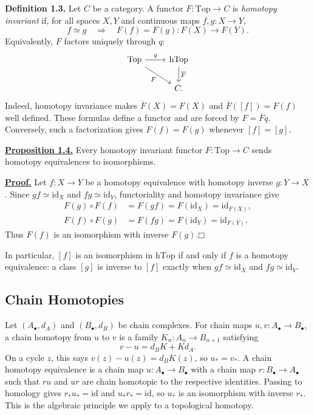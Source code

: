 \documentclass[11pt]{article}
\newcommand{\coursebold}[1]{{\color{burgundy}\textbf{#1}}}
\newcommand{\facehead}[1]{\subsection{#1}}
\begin{document}
\hypertarget{def:homotopy-invariant}{}\coursebold{Definition 1.3.} Let $C$ be a category. A functor $F:\mathrm{Top}\to C$ is \emph{homotopy invariant} if, for all spaces $X,Y$ and continuous maps $f,g:X\to Y$,
\[
f\simeq g\quad\Longrightarrow\quad F(f)=F(g):F(X)\longrightarrow F(Y).
\]
Equivalently, $F$ factors uniquely through $q$:
\[
\begin{tikzcd}
\mathrm{Top}\arrow[r,"q"]\arrow[dr,"F"']&\mathrm{hTop}\arrow[d,"\overline F"]\\
&C.
\end{tikzcd}
\]
Indeed, homotopy invariance makes $\overline F(X)=F(X)$ and $\overline F([f])=F(f)$ well defined. These formulas define a functor and are forced by $F=\overline Fq$. Conversely, such a factorization gives $F(f)=F(g)$ whenever $[f]=[g]$.

\hypertarget{prop:homotopy-invariant}{}\coursebold{\hyperlink{proof:homotopy-invariant}{Proposition 1.4.}} Every homotopy invariant functor $F:\mathrm{Top}\to C$ sends homotopy equivalences to isomorphisms.

\hypertarget{proof:homotopy-invariant}{}\coursebold{\hyperlink{prop:homotopy-invariant}{Proof.}} Let $f:X\to Y$ be a homotopy equivalence with homotopy inverse $g:Y\to X$. Since $gf\simeq\mathrm{id}_X$ and $fg\simeq\mathrm{id}_Y$, functoriality and homotopy invariance give
\[
\begin{aligned}
F(g)\circ F(f)&=F(gf)=F(\mathrm{id}_X)=\mathrm{id}_{F(X)},\\
F(f)\circ F(g)&=F(fg)=F(\mathrm{id}_Y)=\mathrm{id}_{F(Y)}.
\end{aligned}
\]
Thus $F(f)$ is an isomorphism with inverse $F(g)$.\hfill$\mdlgwhtsquare$

In particular, $[f]$ is an isomorphism in $\mathrm{hTop}$ if and only if $f$ is a homotopy equivalence: a class $[g]$ is inverse to $[f]$ exactly when $gf\simeq\mathrm{id}_X$ and $fg\simeq\mathrm{id}_Y$.

\facehead{Chain Homotopies}

Let $(A_\bullet,d_A)$ and $(B_\bullet,d_B)$ be chain complexes. For chain maps $u,v:A_\bullet\to B_\bullet$, a chain homotopy from $u$ to $v$ is a family $K_n:A_n\to B_{n+1}$ satisfying
\[v-u=d_BK+Kd_A.\]
On a cycle $z$, this says $v(z)-u(z)=d_BK(z)$, so $u_*=v_*$. A chain homotopy equivalence is a chain map $u:A_\bullet\to B_\bullet$ with a chain map $r:B_\bullet\to A_\bullet$ such that $ru$ and $ur$ are chain homotopic to the respective identities. Passing to homology gives $r_*u_*=\mathrm{id}$ and $u_*r_*=\mathrm{id}$, so $u_*$ is an isomorphism with inverse $r_*$. This is the algebraic principle we apply to a topological homotopy.
\end{document}
